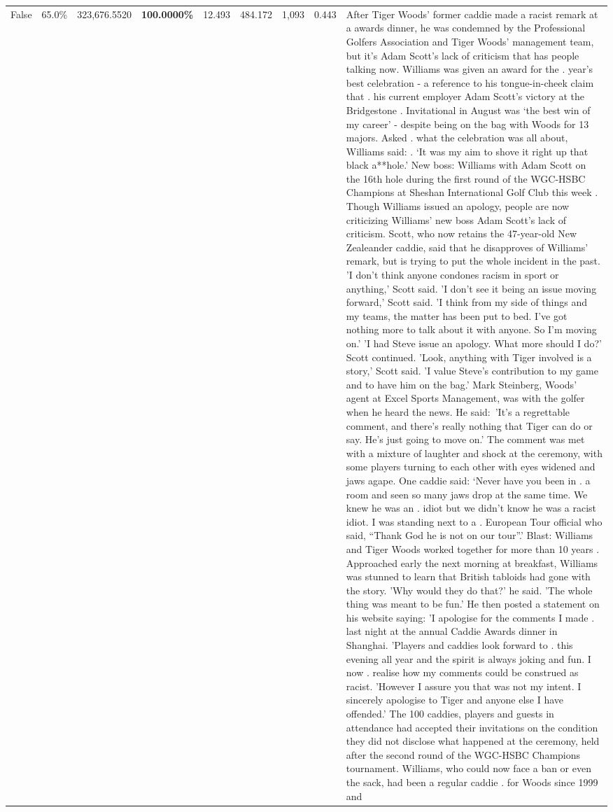 \begin{table}[H]
\begin{tabular}{lllrlllll}
False & 65.0\% & 323,676.5520 & \bfseries \color{red} 100.0000\% & 12.493 & 484.172 & 1,093 & 0.443 & After Tiger Woods' former caddie made a racist remark at a awards dinner, he was condemned by the Professional Golfers Association and Tiger Woods' management team, but it's Adam Scott's lack of criticism that has people talking now. Williams was given an award for the . year’s best celebration - a reference to his tongue-in-cheek claim that . his current employer Adam Scott’s victory at the Bridgestone . Invitational in August was ‘the best win of my career’ - despite being on the bag with Woods for 13 majors. Asked . what the celebration was all about, Williams said: . ‘It was my aim to shove it right up that black a**hole.’ New boss: Williams with Adam Scott  on the 16th hole during the first round of the WGC-HSBC Champions at Sheshan International Golf Club this week . Though Williams issued an apology, people are now criticizing Williams' new boss Adam Scott's lack of criticism. Scott, who now retains the 47-year-old New Zealeander caddie, said that he disapproves of Williams' remark, but is trying to put the whole incident in the past. 'I don't think anyone condones racism in sport or anything,' Scott said. 'I don't see it being an issue moving forward,' Scott said. 'I think from my side of things and my teams, the matter has been put to bed. I've got nothing more to talk about it with anyone. So I'm moving on.' 'I had Steve issue an apology. What more should I do?' Scott continued. 'Look, anything with Tiger involved is a story,' Scott said. 'I value Steve's contribution to my game and to have him on the bag.' Mark Steinberg, Woods' agent at Excel Sports Management, was with the golfer when he heard the news. He said: 'It's a regrettable comment, and there's really nothing that Tiger can do or say. He's just going to move on.' The comment was met with a mixture of laughter and shock at the ceremony, with some players turning to each other with eyes widened and jaws agape. One caddie said: ‘Never have you been in . a room and seen so many jaws drop at the same time. We knew he was an . idiot but we didn’t know he was a racist idiot. I was standing next to a . European Tour official who said, “Thank God he is not on our tour”.’ Blast: Williams and Tiger Woods worked together for more than 10 years . Approached early the next morning at breakfast, Williams was stunned to learn that British tabloids had gone with the story. 'Why would they do that?' he said. 'The whole thing was meant to be fun.' He then posted a statement on his website saying: 'I apologise for the comments I made . last night at the annual Caddie Awards dinner in Shanghai. 'Players and caddies look forward to . this evening all year and the spirit is always joking and fun. I now . realise how my comments could be construed as racist. 'However I assure you that was not my intent. I sincerely apologise to Tiger and anyone else I have offended.' The 100 caddies, players and guests in attendance had accepted their invitations on the condition they did not disclose what happened at the ceremony, held after the second round of the WGC-HSBC Champions tournament. Williams, who could now face a ban or even the sack, had been a regular caddie . for Woods since 1999 and 
\end{tabular}
\end{table}
